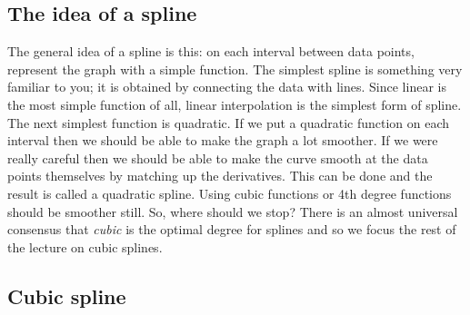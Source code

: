 
\subsection*{The idea of a spline}

The general idea of a spline is this: on each interval between data
points, represent the graph with a simple function.
The simplest spline is something very familiar to you;
it is obtained by connecting the data with lines.
Since linear is the most simple function of all,
linear interpolation is the simplest form of spline. The next simplest
function is quadratic. If we put a quadratic function on each interval
then we should be able to make the graph a lot smoother. If we were
really careful then we should be able to make the curve smooth at
the data points themselves by matching up the derivatives.
This can be done and the result is called a quadratic spline.
Using cubic functions or 4th degree functions should be smoother still.
So, where should we stop? There is an almost universal consensus that
{\em cubic} is the optimal degree for splines and so we focus the
rest of the lecture on cubic splines.




\subsection*{Cubic spline}


